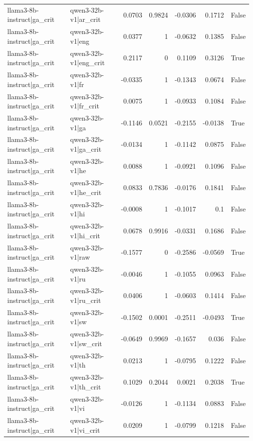 \begin{table}
\begin{tabular}{l l r r r r l}
llama3-8b-instruct|ga_crit & qwen3-32b-v1|ar_crit & 0.0703 & 0.9824 & -0.0306 & 0.1712 & False \\
llama3-8b-instruct|ga_crit & qwen3-32b-v1|eng & 0.0377 & 1 & -0.0632 & 0.1385 & False \\
llama3-8b-instruct|ga_crit & qwen3-32b-v1|eng_crit & 0.2117 & 0 & 0.1109 & 0.3126 & True \\
llama3-8b-instruct|ga_crit & qwen3-32b-v1|fr & -0.0335 & 1 & -0.1343 & 0.0674 & False \\
llama3-8b-instruct|ga_crit & qwen3-32b-v1|fr_crit & 0.0075 & 1 & -0.0933 & 0.1084 & False \\
llama3-8b-instruct|ga_crit & qwen3-32b-v1|ga & -0.1146 & 0.0521 & -0.2155 & -0.0138 & True \\
llama3-8b-instruct|ga_crit & qwen3-32b-v1|ga_crit & -0.0134 & 1 & -0.1142 & 0.0875 & False \\
llama3-8b-instruct|ga_crit & qwen3-32b-v1|he & 0.0088 & 1 & -0.0921 & 0.1096 & False \\
llama3-8b-instruct|ga_crit & qwen3-32b-v1|he_crit & 0.0833 & 0.7836 & -0.0176 & 0.1841 & False \\
llama3-8b-instruct|ga_crit & qwen3-32b-v1|hi & -0.0008 & 1 & -0.1017 & 0.1 & False \\
llama3-8b-instruct|ga_crit & qwen3-32b-v1|hi_crit & 0.0678 & 0.9916 & -0.0331 & 0.1686 & False \\
llama3-8b-instruct|ga_crit & qwen3-32b-v1|raw & -0.1577 & 0 & -0.2586 & -0.0569 & True \\
llama3-8b-instruct|ga_crit & qwen3-32b-v1|ru & -0.0046 & 1 & -0.1055 & 0.0963 & False \\
llama3-8b-instruct|ga_crit & qwen3-32b-v1|ru_crit & 0.0406 & 1 & -0.0603 & 0.1414 & False \\
llama3-8b-instruct|ga_crit & qwen3-32b-v1|sw & -0.1502 & 0.0001 & -0.2511 & -0.0493 & True \\
llama3-8b-instruct|ga_crit & qwen3-32b-v1|sw_crit & -0.0649 & 0.9969 & -0.1657 & 0.036 & False \\
llama3-8b-instruct|ga_crit & qwen3-32b-v1|th & 0.0213 & 1 & -0.0795 & 0.1222 & False \\
llama3-8b-instruct|ga_crit & qwen3-32b-v1|th_crit & 0.1029 & 0.2044 & 0.0021 & 0.2038 & True \\
llama3-8b-instruct|ga_crit & qwen3-32b-v1|vi & -0.0126 & 1 & -0.1134 & 0.0883 & False \\
llama3-8b-instruct|ga_crit & qwen3-32b-v1|vi_crit & 0.0209 & 1 & -0.0799 & 0.1218 & False \\

\end{tabular}
\end{table}
